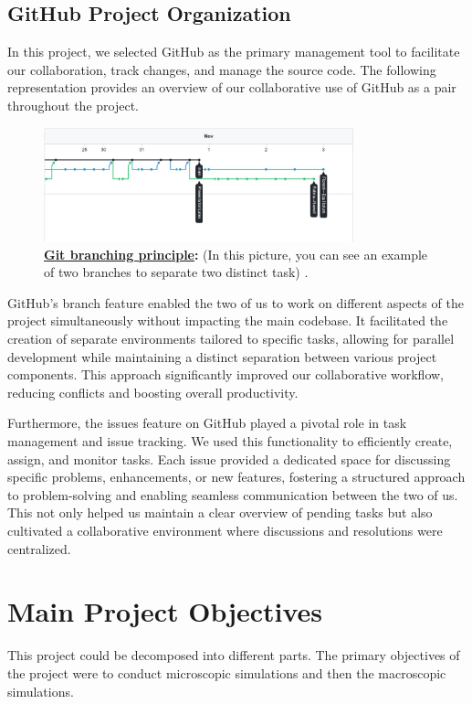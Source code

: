 \documentclass{article}
\begin{document}
\subsection{GitHub Project Organization}
	In this project, we selected GitHub as the primary management tool to facilitate our collaboration, track changes, and manage the source code. The following representation provides an overview of our collaborative use of GitHub as a pair throughout the project.
	\begin{figure}[H]
		\centering
		\includegraphics[width=0.8\textwidth]{GitHub.jpg}
		\caption[Git Branching Principle]{\textbf{\underline{Git branching principle}:} (In this picture, you can see an example of two branches to separate two distinct task) .}
		\label{fig:GitHub}
	\end{figure}
	
	GitHub's branch feature enabled the two of us to work on different aspects of the project simultaneously without impacting the main codebase. It facilitated the creation of separate environments tailored to specific tasks, allowing for parallel development while maintaining a distinct separation between various project components. This approach significantly improved our collaborative workflow, reducing conflicts and boosting overall productivity.
	
	Furthermore, the issues feature on GitHub played a pivotal role in task management and issue tracking. We used this functionality to efficiently create, assign, and monitor tasks. Each issue provided a dedicated space for discussing specific problems, enhancements, or new features, fostering a structured approach to problem-solving and enabling seamless communication between the two of us. This not only helped us maintain a clear overview of pending tasks but also cultivated a collaborative environment where discussions and resolutions were centralized.
	\section{Main Project Objectives}
	
	This project could be decomposed into different parts. The primary objectives of the project were to conduct microscopic simulations and then the macroscopic simulations.
\end{document}
